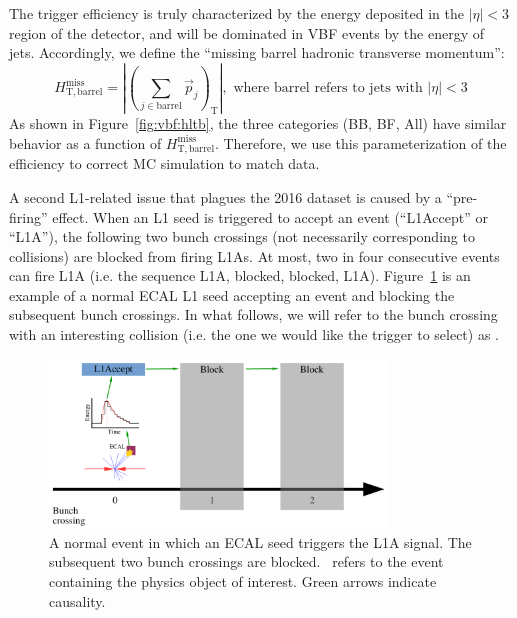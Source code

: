 The trigger efficiency is truly characterized by the energy deposited in the $|\eta|<3$ region of the detector, and will be dominated in VBF events by the energy of jets.
Accordingly, we define the ``missing barrel hadronic transverse momentum'':
\begin{equation}
    H_\mathrm{T,barrel}^\mathrm{miss} = \left|\left(\sum_{j\in\text{barrel}} \vec{p}_j \right)_\mathrm{T}\right|, \text{ where barrel refers to jets with $|\eta|<3$}
\end{equation}
As shown in Figure~\ref{fig:vbf:hltb}, the three categories (BB, BF, All) have similar behavior as a function of $H_\mathrm{T,barrel}^\mathrm{miss}$.
Therefore, we use this parameterization of the efficiency to correct MC simulation to match data. 

A second L1-related issue that plagues the 2016 dataset is caused by a ``pre-firing'' effect.
When an L1 seed is triggered to accept an event (``L1Accept'' or ``L1A''), the following two bunch crossings (not necessarily corresponding to collisions) are blocked from firing L1As. 
At most, two in four consecutive events can fire L1A (i.e. the sequence L1A, blocked, blocked, L1A).
Figure~\ref{fig:vbf:pre1} is an example of a normal ECAL L1 seed accepting an event and blocking the subsequent bunch crossings.
In what follows, we will refer to the bunch crossing with an interesting collision (i.e. the one we would like the trigger to select) as .

\begin{figure}
    \begin{center}
        \includegraphics[width=0.8\textwidth,page=1]{figures/vbf/triggers/l1diag.pdf}
        \caption{A normal event in which an ECAL seed triggers the L1A signal. 
                 The subsequent two bunch crossings are blocked. 
                 ~refers to the event containing the physics object of interest.
                 Green arrows indicate causality.}
        \label{fig:vbf:pre1}
    \end{center}
\end{figure}

